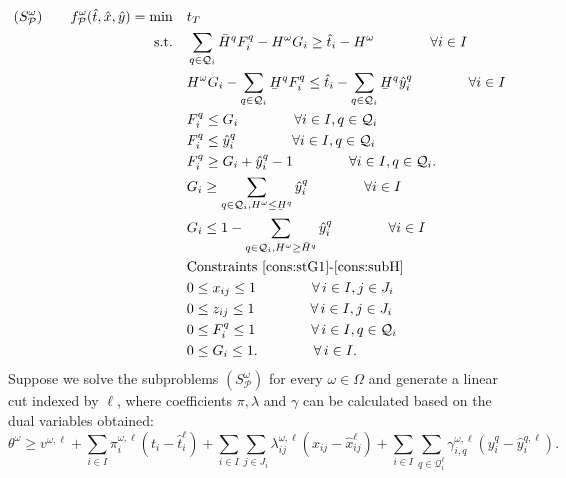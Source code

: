 \documentclass[11pt]{article}
\renewcommand{\underbar}{\underaccent{\bar}}
\begin{document}
	\begin{subequations}
		\label{prob:subTightened}
		\begin{align}
		(S_{\mathcal{P}}^\omega) \qquad f^\omega_{\mathcal{P}}(\hat{t},\hat{x},\hat{y}) = \min \quad & t_T \\
		\text{s.t.} \quad & \sum_{q \in \mathcal{Q}_i} \bar{H}^q F_i^q - H^\omega G_i \geq \hat{t}_i - H^\omega \qquad \qquad \forall i \in I \label{cons:sFG1t}\\
		& H^\omega G_i - \sum_{q \in \mathcal{Q}_i} \underbar{H}^q F_i^q \leq \hat{t}_i - \sum_{q \in \mathcal{Q}_i} \underbar{H}^q \hat{y}_i^q \qquad \qquad \forall i \in I \label{cons:sFG2t}\\
		& F_i^q \leq G_i \qquad \qquad \forall i \in I, q \in \mathcal{Q}_i \label{cons:sFGlin1t}\\
		& F_i^q \leq \hat{y}_i^q \qquad \qquad \forall i \in I, q \in \mathcal{Q}_i \label{cons:sFGlin2t}\\
		& F_i^q \geq G_i + \hat{y}_i^q - 1 \qquad \qquad \forall i \in I, q \in \mathcal{Q}_i. \label{cons:sFGlin3t}\\
		& G_i \geq \sum_{q \in \mathcal{Q}_i, H^\omega \leq \underbar{H}^q} \hat{y}_i^q \qquad \qquad \forall i \in I \label{cons:syG1t}\\
		& G_i \leq 1 - \sum_{q \in \mathcal{Q}_i, H^\omega \geq \bar{H}^q} \hat{y}_i^q \qquad \qquad \forall i \in I \label{cons:syG2t}\\
		& \text{Constraints~\eqref{cons:stG1}-\eqref{cons:subH}}\\
		& 0 \leq x_{ij} \leq 1 \qquad \qquad \forall \,i \in I, j \in J_i\\
		& 0 \leq z_{ij} \leq 1 \qquad \qquad \forall \,i \in I, j \in J_i\\
		& 0 \leq F_i^q \leq 1 \qquad \qquad \forall \,i \in I, q \in \mathcal{Q}_i\\
		& 0 \leq G_i \leq 1. \qquad \qquad \forall \,i \in I. \label{cons:G01t}
		\end{align}
	\end{subequations}
	Suppose we solve the subproblems \((S_{\mathcal{P}}^\omega)\) for every \(\omega \in \Omega\) and generate a linear cut indexed by \(\ell\), where coefficients \(\pi,\lambda\) and \(\gamma\) can be calculated based on the dual variables obtained:
	\begin{equation} \label{cons:cut}
	\theta^\omega \geq v^{\omega,\ell} + \sum_{i \in I} \pi_i^{\omega,\ell} (t_i - \hat{t}_i^{\ell}) + \sum_{i \in I} \sum_{j \in J_i} \lambda_{ij}^{\omega,\ell} (x_{ij} - \hat{x}_{ij}^{\ell}) + \sum_{i \in I} \sum_{q \in \mathcal{Q}^{\ell}_i} \gamma_{i,q}^{\omega,\ell} \left( y_i^{q} - \hat{y}_i^{q,\ell} \right).
	\end{equation}
\end{document}
